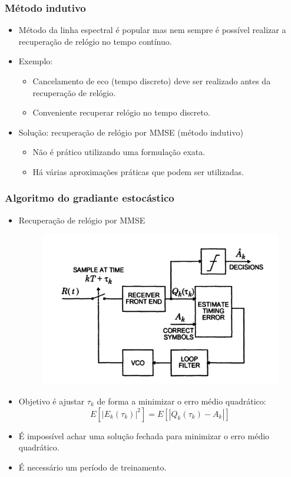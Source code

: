 \begin{frame}
	\frametitle{Método indutivo}
	
	\begin{itemize}
		\item Método da linha espectral é popular mas nem sempre é possível realizar a recuperação de relógio no tempo contínuo.
		\item Exemplo:
		\begin{itemize}
			\item Cancelamento de eco (tempo discreto) deve ser realizado antes da recuperação de relógio.
			\item Conveniente recuperar relógio no tempo discreto.
		\end{itemize}
		\item Solução: recuperação de relógio por MMSE (método indutivo)
		\begin{itemize}
			\item Não é prático utilizando uma formulação exata.
			\item Há várias aproximações práticas que podem ser utilizadas.
		\end{itemize}
		
	\end{itemize}			
\end{frame}



\begin{frame}
	\frametitle{Algoritmo do gradiante estocástico}
	\begin{itemize}
		\item Recuperação de relógio por MMSE
		\begin{figure}
			\includegraphics[width=.4\textwidth]{figs/mmse_timing_recovery}
		\end{figure}
		\item Objetivo é ajustar $\tau_k$ de forma a minimizar o erro médio quadrático:
		\begin{equation*}
		E[|E_k(\tau_k)|^2] =  E[|Q_k(\tau_k)-A_k| ]
		\end{equation*}
		
		\item É impossível achar uma solução fechada para minimizar o erro médio quadrático.
		\item É necessário um período de treinamento.
	\end{itemize}			
\end{frame}

